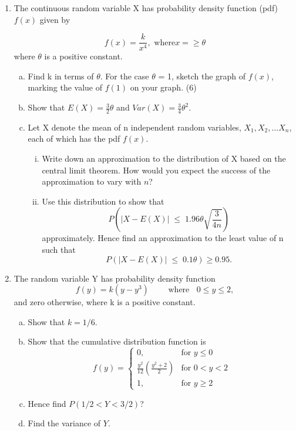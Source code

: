 \documentclass[a4paper,12pt]{article}
\begin{document}


\begin{enumerate}
 
\item The continuous random variable X has probability density function (pdf) $f(x)$ given by

\[ f(x) = \frac{k}{x^4},  \mbox{ where} x= \geq \theta\]
where $\theta$ is a positive constant.
\begin{enumerate}[(a)]
\item  Find k in terms of $\theta$. For the case $\theta$ = 1, sketch the graph of $f(x)$, marking the value of $f(1)$ on your graph. (6)
\item  Show that $E(X) = \frac{3}{2}\theta$ and $Var(X) = \frac{3}{4} \theta^2$.
 
\item Let X denote the mean of n independent random variables, $X_1, X_2,\ldots X_n$, each of which has the pdf $f(x)$.
\begin{enumerate}[(i)]
\item Write down an approximation to the distribution of X based on the central limit theorem. How would you expect the success of the approximation to vary with $n$? 
\item Use this distribution to show that $$P\left( |X - E(X)| \; \leq \; 1.96 \theta \sqrt{\frac{3}{4n}} \right)$$ approximately. Hence find an approximation to the least value of n such that $$P\left( |X - E(X)| \; \leq \; 0.1 \theta  \right) \geq 0.95 . $$
\end{enumerate}
\end{enumerate}

    \item 

 The random variable Y has probability density function
\[f ( y) = k( y - y^3 ) \qquad  \mbox{ where } \;\;0 \leq y \leq 2, \]
and zero otherwise, where k is a positive constant.
\begin{enumerate}[(a)]
\item Show that $k = 1/6$.
\item Show that the cumulative distribution function is
  \[
    f(y) = \begin{cases}
        0, & \text{for } y \leq 0\\
        \frac{y^2}{12}\left( \frac{y^2+2}{2} \right)  & \text{for } 0 < y < 2\\
        1, & \text{for }  y\geq 2
        \end{cases} 
  \]
\item 
Hence find $P( 1/2 < Y < 3/2)$?
\item  Find the variance of $Y$.
\end{enumerate}


\end{enumerate}
\end{document}
